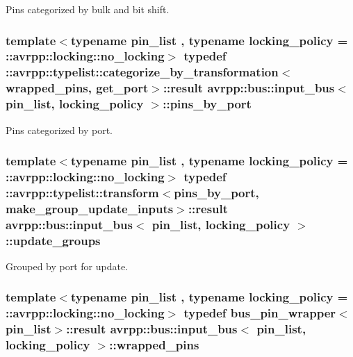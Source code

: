 Pins categorized by bulk and bit shift. 

\hypertarget{structavrpp_1_1bus_1_1input__bus_a991bf34f4a8c2228bcc1f10223b2f985}{
\subsubsection[{pins\_\-by\_\-port}]{\setlength{\rightskip}{0pt plus 5cm}template$<$typename pin\_\-list , typename locking\_\-policy  = ::avrpp::locking::no\_\-locking$>$ typedef ::avrpp::typelist::categorize\_\-by\_\-transformation$<${\bf wrapped\_\-pins}, {\bf get\_\-port}$>$::result {\bf avrpp::bus::input\_\-bus}$<$ pin\_\-list, locking\_\-policy $>$::{\bf pins\_\-by\_\-port}}}
\label{structavrpp_1_1bus_1_1input__bus_a991bf34f4a8c2228bcc1f10223b2f985}


Pins categorized by port. 

\hypertarget{structavrpp_1_1bus_1_1input__bus_ab516c7ff6d9e97584d886caa09dff68d}{
\subsubsection[{update\_\-groups}]{\setlength{\rightskip}{0pt plus 5cm}template$<$typename pin\_\-list , typename locking\_\-policy  = ::avrpp::locking::no\_\-locking$>$ typedef ::avrpp::typelist::transform$<${\bf pins\_\-by\_\-port}, {\bf make\_\-group\_\-update\_\-inputs}$>$::result {\bf avrpp::bus::input\_\-bus}$<$ pin\_\-list, locking\_\-policy $>$::{\bf update\_\-groups}}}
\label{structavrpp_1_1bus_1_1input__bus_ab516c7ff6d9e97584d886caa09dff68d}


Grouped by port for update. 

\hypertarget{structavrpp_1_1bus_1_1input__bus_a3b24c1489f5178105f4edbe7db7d3e89}{
\subsubsection[{wrapped\_\-pins}]{\setlength{\rightskip}{0pt plus 5cm}template$<$typename pin\_\-list , typename locking\_\-policy  = ::avrpp::locking::no\_\-locking$>$ typedef bus\_\-pin\_\-wrapper$<$pin\_\-list$>$::result {\bf avrpp::bus::input\_\-bus}$<$ pin\_\-list, locking\_\-policy $>$::{\bf wrapped\_\-pins}}}
\label{structavrpp_1_1bus_1_1input__bus_a3b24c1489f5178105f4edbe7db7d3e89}


